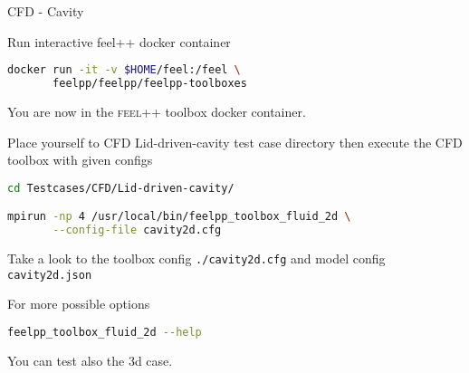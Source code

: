 


\begin{frame}{CFD - Cavity}

Run  interactive feel++ docker container

\begin{lstlisting}[language=Bash,mathescape=false,emph={docker}]
docker run -it -v $HOME/feel:/feel \
       feelpp/feelpp/feelpp-toolboxes 
\end{lstlisting}

You are now in the \textsc{feel++} toolbox docker container.

Place yourself to CFD Lid-driven-cavity test case directory then execute the
CFD toolbox with given configs

\begin{lstlisting}[language=Bash,mathescape=false, emph={feelpp_toolbox_fluid_2d}]
cd Testcases/CFD/Lid-driven-cavity/

mpirun -np 4 /usr/local/bin/feelpp_toolbox_fluid_2d \
       --config-file cavity2d.cfg
\end{lstlisting}

Take a look to the toolbox config \lstinline{./cavity2d.cfg} and model config
\lstinline{cavity2d.json}

For more possible options
\begin{lstlisting}[language=Bash,mathescape=false, emph={feelpp_toolbox_fluid_2d}]
feelpp_toolbox_fluid_2d --help
\end{lstlisting}

You can test also the 3d case.

\end{frame}



%
%
%
%
%
%
%
%

